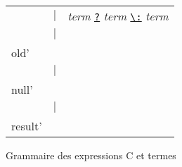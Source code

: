 \begin{figure}[h!]
\begin{tabular}{lrl}
    & $\mid$ & \textit{term} \underline{\texttt{?}} \textit{term}
    \underline{\lstinline'\:'} \textit{term}\\
    & $\mid$ & \underline{\lstinline'\\old'} \underline{\lstinline'('} \textit{term}
    \underline{\lstinline')'} \\
    & $\mid$ & \underline{\lstinline'\\null'} \\
    & $\mid$ & \underline{\lstinline'\\result'} \\
  \end{tabular}
  \caption{Grammaire des expressions C et termes \eacsl}
  \label{fig:gram-exp-term}
\end{figure}
